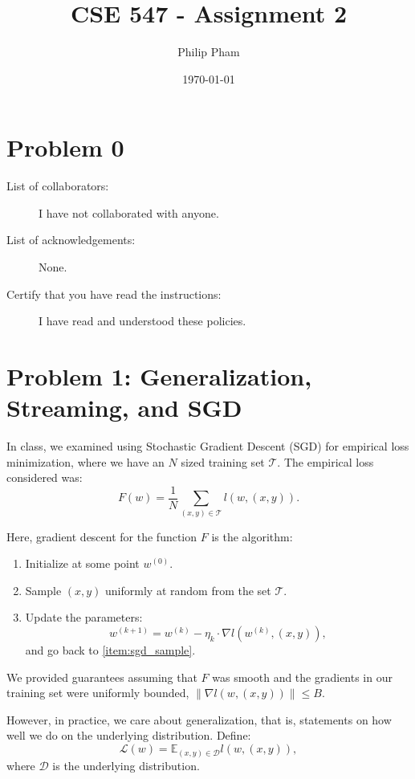 \documentclass[letterpaper,11pt]{article}
\author{Philip Pham}
\date{\today}
\title{CSE 547 - Assignment 2}
\begin{document}
\maketitle

\section*{Problem 0}

\begin{description}
\item[List of collaborators:] I have not collaborated with anyone.
\item[List of acknowledgements:] None.
\item[Certify that you have read the instructions:] I have read and understood
  these policies.
\end{description}

\section*{Problem 1: Generalization, Streaming, and SGD}

In class, we examined using Stochastic Gradient Descent (SGD) for empirical loss
minimization, where we have an $N$ sized training set $\mathcal{T}$. The
empirical loss considered was:
\begin{equation}
  F(w) = \frac{1}{N} \sum_{(x,y) \in \mathcal{T}} l\left(w,(x,y)\right).
\end{equation}

Here, gradient descent for the function $F$ is the algorithm:
\begin{enumerate}
\item Initialize at some point $w^{(0)}$.
\item Sample $(x,y)$ uniformly at random from the set $\mathcal{T}$.
  \label{item:sgd_sample}
\item Update the parameters:
  \begin{equation}
    w^{(k+1)} = w^{(k)} - \eta_k \cdot \nabla l\left(w^{(k)},(x,y)\right),
  \end{equation}
  and go back to \ref{item:sgd_sample}.
\end{enumerate}

We provided guarantees assuming that $F$ was smooth and the gradients in our
training set were uniformly bounded,
$\lVert \nabla l\left(w, (x,y)\right) \rVert \leq B$.

However, in practice, we care about generalization, that is, statements on how
well we do on the underlying distribution. Define:
\begin{equation}
  \mathcal{L}(w) = \mathbb{E}_{(x,y) \in \mathcal{D}}l\left(w, (x,y)\right),
\end{equation}
where $\mathcal{D}$ is the underlying distribution.
\end{document}
